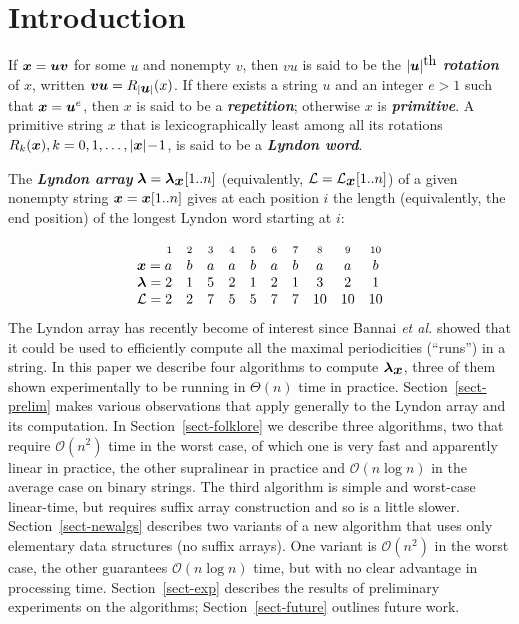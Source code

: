 \documentclass[10pt]{llncs}
\def\s#1{\mbox{\boldmath $#1$}}
\def\-{\!-\!}
\def\itbf#1{\textit{\textbf{#1}}}
\def\L{\mathcal{L}}
\def\O{\mathcal{O}}
\begin{document}
\section{Introduction}
\label{sect-intro}
If $\s{x} = \s{uv}$ for some \s{u} and nonempty \s{v},
then \s{vu} is said to be the $|\s{u}|^{\mbox{th}}$ \itbf{rotation} of \s{x},
written $\s{vu} = R_{|\s{u}|}(x)$.
If there exists a string \s{u} and an integer $e > 1$
such that $\s{x} = \s{u}^e$,
then \s{x} is said to be a \itbf{repetition};
otherwise \s{x} is \itbf{primitive}.
A primitive string \s{x} that is
lexicographically least among all its rotations
$R_k(\s{x}), k= 0,1,\ldots,|\s{x}|\- 1$,
is said to be a \itbf{Lyndon word}.

The \itbf{Lyndon array} $\s{\lambda} = \s{\lambda}_{\s{x}}[1..n]$
(equivalently, $\L = \L_{\s{x}}[1..n]$)
of a given nonempty string $\s{x} = \s{x}[1..n]$
gives at each position $i$ the length
(equivalently, the end position)
of the longest Lyndon word starting at $i$:

\begin{equation}
\label{ex1}
\begin{array}{rccccccccc}
\scriptstyle 1 & \scriptstyle 2 & \scriptstyle 3 & \scriptstyle 4 & \scriptstyle 5 & \scriptstyle 6 & \scriptstyle 7 & \scriptstyle 8 & \scriptstyle 9 & \scriptstyle 10 \\
\s{x} = a & b & a & a & b & a & b & a & a & b \\
\s{\lambda} = 2 & 1 & 5 & 2 & 1 & 2 & 1 & 3 & 2 & 1 \\
\L = 2 & 2 & 7 & 5 & 5 & 7 & 7 & 10 & 10 & 10
\end{array}
\end{equation}
The Lyndon array has recently become of interest since
Bannai {\it et al.} \cite{BIINTT14} showed that it could
be used to efficiently compute all the maximal periodicities (``runs'')
in a string.
In this paper we describe four algorithms to compute $\s{\lambda}_{\s{x}}$,
three of them shown experimentally to be running in $\Theta(n)$ time in practice.
Section~\ref{sect-prelim} makes various observations that
apply generally to the Lyndon array and its computation.
In Section~\ref{sect-folklore} we describe three
algorithms, two that require $\O(n^2)$ time in the worst case,
of which one is very fast and apparently linear in practice,
the other supralinear in practice and $\O(n\log n)$ in the average case on binary strings.
The third algorithm is simple and worst-case linear-time,
but requires suffix array construction and so is a little slower.
Section~\ref{sect-newalgs} describes two variants of a new algorithm
that uses only elementary data structures (no suffix arrays).
One variant is $\O(n^2)$ in the worst case,
the other guarantees $\O(n\log n)$ time,
but with no clear advantage in processing time.
Section~\ref{sect-exp} describes the results of
preliminary experiments on the algorithms;
Section~\ref{sect-future} outlines future work.
\end{document}
